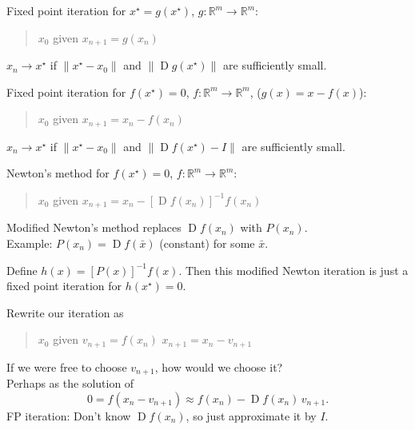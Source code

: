 \documentclass[landscape,footrule,20pt]{foils}
\newcommand{\xs}{x^\star}
\newcommand{\R}{\mathbb{R}}
\newcommand{\norm}[1]{\lVert#1\rVert}
\DeclareMathOperator{\D}{D}
\newcommand{\Df}{\D\!\!f}
\begin{document}
\author{Neil N. Carlson \\ Keith Miller}
\date{}
\maketitle


Fixed point iteration for $\xs=g(\xs)$, $g:\R^m \to \R^m$:
\begin{quote}\begin{algorithmic}
\STATE $x_0$ given
  \STATE $x_{n+1} = g(x_n)$
\ENDFOR
\end{algorithmic}\end{quote}
$x_n\to\xs$ if $\norm{\xs-x_0}$ and $\norm{\D\!\!g(\xs)}$ are sufficiently small.

Fixed point iteration for $f(\xs)=0$, $f:\R^m \to \R^m$, ($g(x) = x - f(x)$):
\begin{quote}\begin{algorithmic}
\STATE $x_0$ given
  \STATE $x_{n+1} = x_n - f(x_n)$
\ENDFOR
\end{algorithmic}\end{quote}
$x_n\to\xs$ if $\norm{\xs-x_0}$ and $\norm{\Df(\xs)-I}$ are sufficiently small.



Newton's method for $f(\xs)=0$, $f:\R^m \to \R^m$:
\begin{quote}
\begin{algorithmic}
\STATE $x_0$ given
  \STATE $x_{n+1} = x_n - [\Df(x_n)]^{-1}f(x_n)$
\ENDFOR
\end{algorithmic}
\end{quote}

Modified Newton's method replaces $\Df(x_n)$ with $P(x_n)$. \\
Example: $P(x_n)=\Df(\bar{x})$ (constant) for some $\bar{x}$.

Define $h(x)=[P(x)]^{-1} f(x)$.  Then this modified Newton iteration
is just a fixed point iteration for $h(\xs)=0$.



Rewrite our iteration as
\begin{quote}\begin{algorithmic}
\STATE $x_0$ given
  \STATE $v_{n+1} = f(x_n)$ \quad{}
  \STATE $x_{n+1} = x_n - v_{n+1}$
\ENDFOR
\end{algorithmic}\end{quote}
If we were free to choose $v_{n+1}$, how would we choose it?\\
Perhaps as the solution of
\begin{equation*}
  0 = f(x_n-v_{n+1}) \approx f(x_n) - \Df(x_n)\,v_{n+1}.
\end{equation*}
FP iteration: Don't know $\Df(x_n)$, so just approximate it by $I$.
\end{document}
